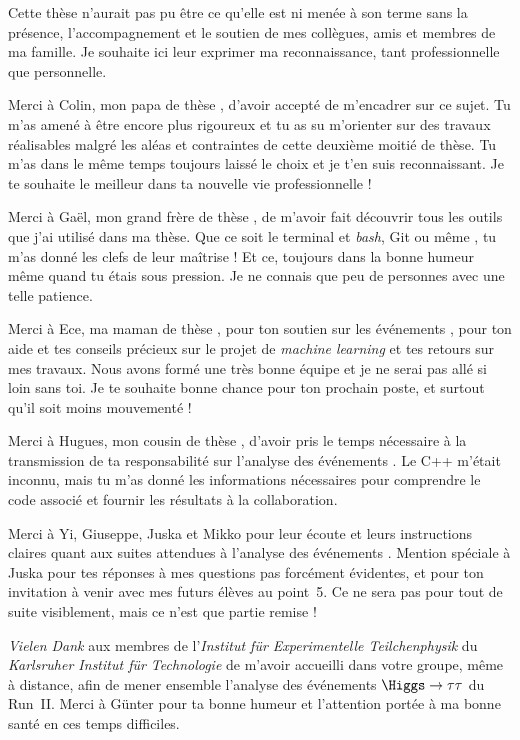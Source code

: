 Cette thèse n'aurait pas pu être ce qu'elle est
ni menée à son terme
sans la présence, l'accompagnement et le soutien
de mes collègues, amis et membres de ma famille.
Je souhaite ici leur exprimer ma reconnaissance,
tant professionnelle que personnelle.
\par
Merci à Colin, mon \og papa de thèse \fg,
d'avoir accepté de m'encadrer sur ce sujet.
Tu m'as amené à être encore plus rigoureux
et
tu as su m'orienter sur des travaux réalisables
malgré les aléas et contraintes de cette deuxième moitié de thèse.
Tu m'as dans le même temps toujours laissé le choix et je t'en suis reconnaissant.
Je te souhaite le meilleur dans ta nouvelle vie professionnelle !
\par
Merci à Gaël, mon \og grand frère de thèse \fg,
de m'avoir fait découvrir tous les outils que j'ai utilisé dans ma thèse.
Que ce soit le terminal et \emph{bash}, Git ou même \HEPPY,
tu m'as donné les clefs de leur maîtrise !
Et ce, toujours dans la bonne humeur même quand tu étais sous pression.
Je ne connais que peu de personnes avec une telle patience.
\par
Merci à Ece, ma \og maman de thèse \fg,
pour ton soutien sur les événements \Gjets,
pour ton aide et tes conseils précieux sur le projet de \emph{machine learning}
et tes retours sur mes travaux.
Nous avons formé une très bonne équipe
et
je ne serai pas allé si loin sans toi.
Je te souhaite bonne chance pour ton prochain poste,
et surtout qu'il soit moins mouvementé !
\par
Merci à Hugues, mon \og cousin de thèse \fg,
d'avoir pris le temps nécessaire à la transmission
de ta responsabilité sur l'analyse des événements \Gjets.
Le C++ m'était inconnu,
mais tu m'as donné les informations nécessaires pour comprendre
le code associé et fournir les résultats à la collaboration.
\par
Merci à
Yi,
Giuseppe,
Juska
et
Mikko
pour leur écoute et leurs instructions claires
quant aux suites attendues à l'analyse des événements \Gjets.
Mention spéciale à Juska pour tes réponses à mes questions pas forcément évidentes,
et pour ton invitation à venir avec mes futurs élèves au point~5.
Ce ne sera pas pour tout de suite visiblement, mais ce n'est que partie remise !
\par
\emph{Vielen Dank} aux membres de l'\emph{Institut für Experimentelle Teilchenphysik}
du \emph{Karlsruher Institut für Technologie}
de m'avoir accueilli dans votre groupe, même à distance,
afin de mener ensemble l'analyse des événements $\Higgs\to\tau\tau$ du Run~II.
Merci à Günter pour ta bonne humeur et l'attention portée à ma bonne santé en ces temps difficiles.
